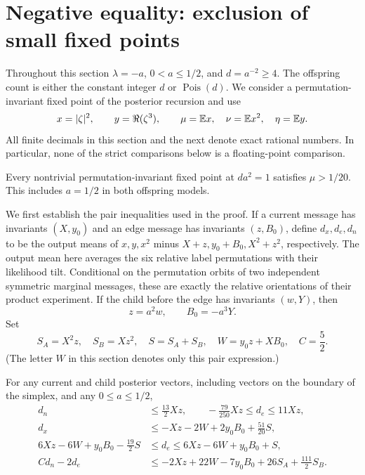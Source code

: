 \section{Negative equality: exclusion of small fixed points}
\label{sec:local}
Throughout this section $\lambda=-a$, $0<a\le 1/2$, and
$d=a^{-2}\ge4$.  The offspring count is either the constant integer $d$
or $\operatorname{Pois}(d)$.  We consider a permutation-invariant fixed
point of the posterior recursion and use
\[
 x=|\zeta|^2,\qquad y=\Re(\zeta^3),\qquad
 \mu=\mathbb E x,\quad \nu=\mathbb E x^2,\quad \eta=\mathbb E y.
\]
All finite decimals in this section and the next denote exact rational
numbers.  In particular, none of the strict comparisons below is a
floating-point comparison.

\begin{proposition}
\label{loc:criterion}\label{loc:gap}
Every nontrivial permutation-invariant fixed point at $da^2=1$ satisfies
$\mu>1/20$.  This includes $a=1/2$ in both offspring models.
\end{proposition}

We first establish the pair inequalities used in the proof.  If a current
message has invariants $(X,y_0)$ and an edge message has invariants
$(z,B_0)$, define $d_x,d_e,d_n$ to be the output means of $x,y,x^2$ minus
$X+z,y_0+B_0,X^2+z^2$, respectively.  The output mean here averages the six
relative label permutations with their likelihood tilt.  Conditional on
the permutation orbits of two independent symmetric marginal messages,
these are exactly the relative orientations of their product experiment.
If the child before the edge has invariants $(w,Y)$, then
\[
 z=a^2w,\qquad B_0=-a^3Y.
\]
Set
\[
 S_A=X^2z,\quad S_B=Xz^2,\quad S=S_A+S_B,\quad
 W=y_0z+XB_0,\quad C=\frac52.
\]
(The letter $W$ in this section denotes only this pair expression.)

\begin{lemma}\label{loc:pair}
For any current and child posterior vectors, including vectors on the
boundary of the simplex, and any $0\le a\le1/2$,
\begin{align}
 d_n&\le \frac{13}{2}Xz,\qquad
 -\frac{79}{250}Xz\le d_e\le11Xz,\label{loc:coarsepair}\\
 d_x&\le-Xz-2W+2y_0B_0+\frac{51}{20}S,\label{loc:xpair}\\
 6Xz-6W+y_0B_0-\frac{19}{2}S
 &\le d_e\le6Xz-6W+y_0B_0+S,\label{loc:ypair}\\
 C d_n-2d_e&\le-2Xz+22W-7y_0B_0+26S_A+\frac{111}{2}S_B.
 \label{loc:kpair}
\end{align}
\end{lemma}

